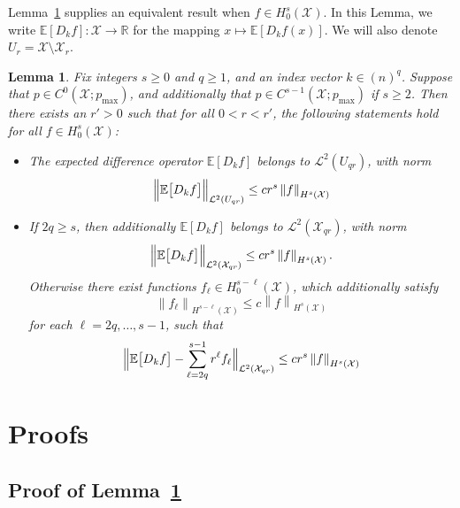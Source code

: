 \documentclass{article}
\newcommand{\Reals}{\mathbb{R}}
\newcommand{\norm}[1]{\left \lVert #1 \right \rVert}
\newcommand{\1}{\mathbf{1}}
\newcommand{\Xset}{\mathcal{X}}
\newcommand{\Leb}{\mathcal{L}}
\newcommand{\Ebb}{\mathbb{E}}
\theoremstyle{alden}
\theoremstyle{aldenthm}
\newtheorem{lemma}{Lemma}
\theoremstyle{definition}
\theoremstyle{remark}
\begin{document}
Lemma~\ref{lem:leading_term_sobolev_compact} supplies an equivalent result when $f \in H_0^{s}(\Xset)$. In this Lemma, we write $\Ebb[D_kf]:\Xset \to \Reals$ for the mapping $x \mapsto \Ebb[D_kf(x)]$. We will also denote $U_r = \Xset \setminus \Xset_{r}$.
\begin{lemma}
	\label{lem:leading_term_sobolev_compact}
	Fix integers $s \geq 0$ and $q \geq 1$, and an index vector $k \in (n)^q$. Suppose that $p \in C^0(\Xset;p_{\max})$, and additionally that $p \in C^{s-1}(\Xset;p_{\max})$ if $s \geq 2$. Then there exists an $r' > 0$ such that for all $0 < r < r'$, the following statements hold for all $f \in H_0^{s}(\Xset)$:
	\begin{itemize}
		\item The expected difference operator $\Ebb[D_kf]$ belongs to $\Leb^2(U_{qr})$, with norm
		\begin{equation}
		\label{eqn:leading_term_sobolev_compact_1}
		\Bigl\|\Ebb\bigl[D_kf\bigr]\Bigr\|_{\Leb^2(U_{qr})} \leq c r^s \norm{f}_{H^s(\Xset)}
		\end{equation}
		\item If $2q \geq s$, then additionally $\Ebb[D_kf]$ belongs to $\Leb^2(\Xset_{qr})$, with norm
		\begin{equation}
		\label{eqn:leading_term_sobolev_compact_2}
		\Bigl\|\Ebb\bigl[D_kf\bigr]\Bigr\|_{\Leb^2(\Xset_{qr})} \leq c r^s \norm{f}_{H^s(\Xset)}.
		\end{equation}
		Otherwise there exist functions $f_{\ell} \in H_0^{s - \ell}(\Xset)$, which additionally satisfy
		\begin{equation}
		\label{eqn:leading_term_sobolev_compact_3}
		\norm{f_{\ell}}_{H^{s - \ell}(\Xset)} \leq c \norm{f}_{H^s(\Xset)}
		\end{equation}
		for each $\ell = 2q,\ldots,s-1$, such that
		\begin{equation}
		\label{eqn:leading_term_sobolev_compact_4}
		\Bigl\|\Ebb\bigl[D_kf\bigr] - \sum_{\ell = 2q}^{s - 1} r^{\ell} f_{\ell}\Bigr\|_{\Leb^2(\Xset_{qr})} \leq c r^s \norm{f}_{H^s(\Xset)}
		\end{equation}
	\end{itemize}
\end{lemma}

\section{Proofs}

\subsection{Proof of Lemma~\ref{lem:leading_term_sobolev_compact}}
\end{document}
